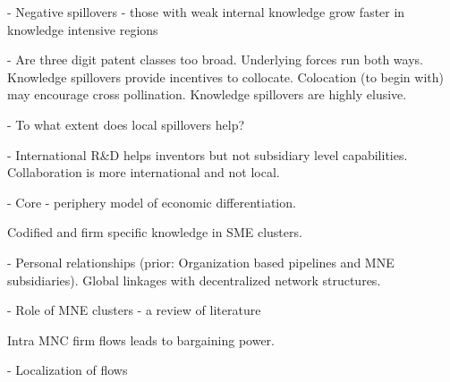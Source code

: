 \documentclass[12pt]{article}
\begin{document}
\cite{Grillitsch2016} - Negative spillovers - those with weak internal knowledge  grow faster in knowledge intensive regions

\cite{Henderson2005} - Are three digit patent classes too broad. Underlying forces run both ways. Knowledge spillovers provide incentives to collocate. Colocation (to begin with) may encourage cross pollination. Knowledge spillovers are highly elusive.

\cite{Huber2011} - To what extent does local spillovers help?

\cite{Alnuaimi2012} - International R\&D helps inventors but not subsidiary level capabilities. Collaboration is more international and not local.

\cite{Jaffe1993}

\cite{Krugman1991} - Core - periphery model of economic differentiation.

\cite{Lissoni2001} Codified and firm specific knowledge in SME clusters.

\cite{Lorenzen2013} - Personal relationships (prior: Organization based pipelines and MNE subsidiaries). Global linkages with decentralized network structures.

\cite{Mudambi2012} - Role of MNE clusters - a review of literature

\cite{Mudambi2004} Intra MNC firm flows leads to bargaining power.

\cite{Murata2013} - Localization of flows

 

\end{document}
